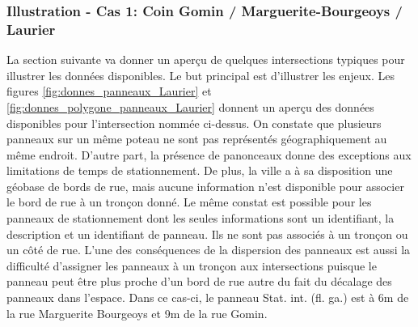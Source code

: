     \subsubsection{Illustration - Cas 1: Coin Gomin / Marguerite-Bourgeoys / Laurier}
    La section suivante va donner un aperçu de quelques intersections typiques pour illustrer les données disponibles. Le but principal est d'illustrer les enjeux.
      Les figures \ref{fig:donnes_panneaux_Laurier} et \ref{fig:donnes_polygone_panneaux_Laurier} donnent un aperçu des données disponibles pour l'intersection nommée ci-dessus. On constate que plusieurs panneaux sur un même poteau ne sont pas représentés géographiquement au même endroit. D'autre part, la présence de panonceaux donne des exceptions aux limitations de temps de stationnement. De plus, la ville a à sa disposition une géobase de bords de rue, mais aucune information n'est disponible pour associer le bord de rue à un tronçon donné. Le même constat est possible pour les panneaux de stationnement dont les seules informations sont un identifiant, la description et un identifiant de panneau. Ils ne sont pas associés à un tronçon ou un côté de rue. L'une des conséquences de la dispersion des panneaux est aussi la difficulté d'assigner les panneaux à un tronçon aux intersections puisque le panneau peut être plus proche d'un bord de rue autre du fait du décalage des panneaux dans l'espace. Dans ce cas-ci, le panneau Stat. int. (fl. ga.) est à 6m de la rue Marguerite Bourgeoys et 9m de la rue Gomin.
